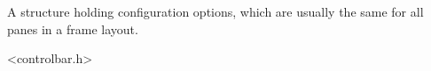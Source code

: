 %
%


\section{}\label{cbcommonpaneproperties}


A structure holding configuration options,
which are usually the same for all panes in
a frame layout.




<controlbar.h>


